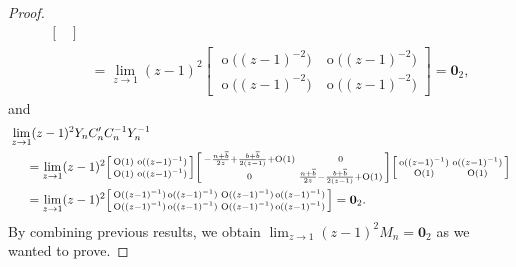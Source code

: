 \documentclass[12pt]{amsart}
\begin{document}
\begin{proof}
{\begin{align*}
\begin{bmatrix}
\end{bmatrix}
 \\
& =\lim_{z \to 1} (z-1)^{2}
\begin{bmatrix}
 \operatorname{o} \big( (z-1)^{-2} \big) &
 \operatorname{o} \big( (z-1)^{-2} \big) \\
\operatorname{o} \big( (z-1)^{-2} \big) &
\operatorname{o}\big( (z-1)^{-2}\big)
\end{bmatrix}
= \mathbf{0}_{2} ,
\end{align*}}
{\hspace{-.075cm}}and
{\small
\begin{align*}
& \lim_{z \to 1} (z-1)^2 Y_n C^\prime_n C^{-1}_n Y_n^{-1} \\
& 
\phantom{ola} = 
\lim _{z \to 1} (z-1)^2 
\begin{bsmallmatrix}
\operatorname{O}(1) & \operatorname{o} ( (z-1)^{-1} ) \\
\operatorname{O}(1) & \operatorname{o} ( (z-1)^{-1} )
\end{bsmallmatrix}
\begin{bsmallmatrix}
-\frac{ n+\overline{b} }{2 z} + \frac{ b+\overline{b} }{2 (z-1)} + \operatorname O (1) & 0 \\
0& \frac{n+\overline{b}}{2 z} - \frac{ b+\overline{b} }{2 (z-1)} + \operatorname O (1)
\end{bsmallmatrix}
\begin{bsmallmatrix}
\operatorname{o} ( (z-1)^{-1} ) & \operatorname{o} ( (z-1)^{-1} ) \\
\operatorname{O}(1) & \operatorname{O}(1) 
\end{bsmallmatrix}
 \\
& \phantom{ola} = \lim _{z \to 1} (z-1)^2
\begin{bsmallmatrix}
\operatorname{O} ( (z-1)^{-1} ) 
\operatorname{o} ( (z-1)^{-1} ) &
 \operatorname{O} ( (z-1)^{-1} ) 
 \operatorname{o} ( (z-1)^{-1} ) \\
\operatorname{O} ( (z-1)^{-1} )
 \operatorname{o} ( (z-1)^{-1} ) & 
\operatorname{O} ( (z-1)^{-1} ) 
\operatorname{o} ( (z-1)^{-1} )
\end{bsmallmatrix}
 =
\mathbf{0}_{2} .
\end{align*}}
{\hspace{-.1cm}}By combining previous results, we obtain
\(\displaystyle
\lim_{z \to 1} (z-1)^{2} M_{n}= \mathbf{0}_{2}
 \)
as we wanted to prove.
\end{proof}
\end{document}
